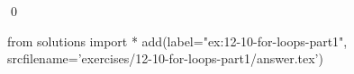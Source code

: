 
\begin{ex}
  \label{ex:12-10-for-loops-part1}
  
  \qed
\end{ex}
\begin{python0}
from solutions import *
add(label="ex:12-10-for-loops-part1",
    srcfilename='exercises/12-10-for-loops-part1/answer.tex')
\end{python0}
